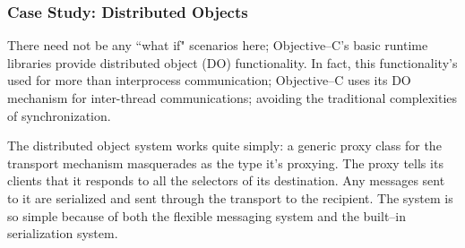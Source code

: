 %
%
%
%
	\subsubsection{Case Study: Distributed Objects}
	There need not be any ``what if" scenarios here; Objective--C's basic runtime libraries provide distributed object (DO) functionality.  In fact, this functionality's used for more than interprocess communication; Objective--C uses its DO mechanism for inter-thread communications; avoiding the traditional complexities of synchronization.

	The distributed object system works quite simply: a generic proxy class for the transport mechanism masquerades as the type it's proxying.  The proxy tells its clients that it responds to all the selectors of its destination.  Any messages sent to it are serialized and sent through the transport to the recipient.  The system is so simple because of both the flexible messaging system and the built--in serialization system.

